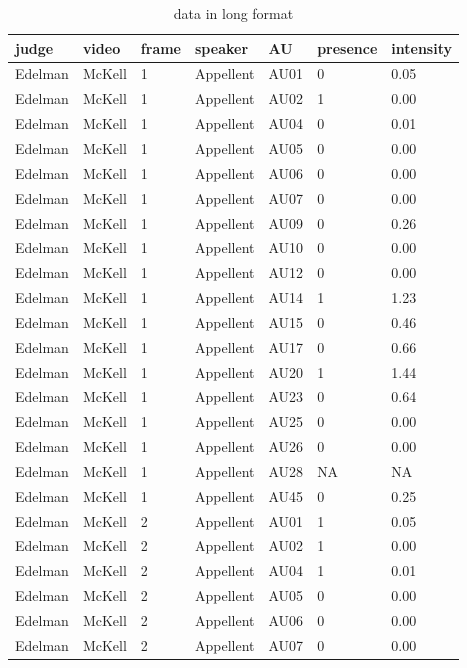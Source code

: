 \documentclass{monashthesis}
\begin{document}
\begin{table}[ht]
\begin{center}
\caption{\label{tab:long} data in long format}
\begin{tabular}{lllllll}
\toprule
judge & video & frame & speaker & AU & presence & intensity \\
\midrule
Edelman & McKell & 1 & Appellent & AU01 &  0 & 0.05 \\
Edelman & McKell & 1 & Appellent & AU02 &  1 & 0.00 \\
Edelman & McKell & 1 & Appellent & AU04 &  0 & 0.01 \\
Edelman & McKell & 1 & Appellent & AU05 &  0 & 0.00 \\
Edelman & McKell & 1 & Appellent & AU06 &  0 & 0.00 \\
Edelman & McKell & 1 & Appellent & AU07 &  0 & 0.00 \\
Edelman & McKell & 1 & Appellent & AU09 &  0 & 0.26 \\
Edelman & McKell & 1 & Appellent & AU10 &  0 & 0.00 \\
Edelman & McKell & 1 & Appellent & AU12 &  0 & 0.00 \\
Edelman & McKell & 1 & Appellent & AU14 &  1 & 1.23 \\
Edelman & McKell & 1 & Appellent & AU15 &  0 & 0.46 \\
Edelman & McKell & 1 & Appellent & AU17 &  0 & 0.66 \\
Edelman & McKell & 1 & Appellent & AU20 &  1 & 1.44 \\
Edelman & McKell & 1 & Appellent & AU23 &  0 & 0.64 \\
Edelman & McKell & 1 & Appellent & AU25 &  0 & 0.00 \\
Edelman & McKell & 1 & Appellent & AU26 &  0 & 0.00 \\
Edelman & McKell & 1 & Appellent & AU28 & NA &   NA \\
Edelman & McKell & 1 & Appellent & AU45 &  0 & 0.25 \\
Edelman & McKell & 2 & Appellent & AU01 &  1 & 0.05 \\
Edelman & McKell & 2 & Appellent & AU02 &  1 & 0.00 \\
Edelman & McKell & 2 & Appellent & AU04 &  1 & 0.01 \\
Edelman & McKell & 2 & Appellent & AU05 &  0 & 0.00 \\
Edelman & McKell & 2 & Appellent & AU06 &  0 & 0.00 \\
Edelman & McKell & 2 & Appellent & AU07 &  0 & 0.00 \\

\end{tabular}
\end{center}
\end{table}
\end{document}

